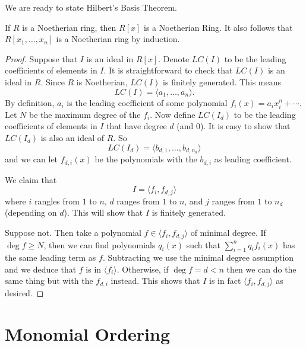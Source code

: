 We are ready to state Hilbert's Basis Theorem.
\begin{theorem}
If $R$ is a Noetherian ring, then $R[x]$ is a Noetherian Ring. It also follows that $R[x_1, \dots, x_n]$ is a Noetherian ring by induction.
\end{theorem}
\begin{proof}
Suppose that $I$ is an ideal in $R[x]$. Denote $LC(I)$ to be the leading coefficients of elements in $I$. It is straightforward to check that $LC(I)$ is an ideal in $R$. Since $R$ is Noetherian, $LC(I)$ is finitely generated. This means
\[LC(I) = \langle a_1, \dots, a_n \rangle.\]
By definition, $a_i$ is the leading coefficient of some polynomial $f_i(x) = a_ix^n_i + \cdots$. Let $N$ be the maximum degree of the $f_i$. Now define $LC(I_d)$ to be the leading coefficients of elements in $I$ that have degree $d$ (and $0$). It is easy to show that $LC(I_d)$ is also an ideal of $R$. So
\[LC(I_d) = \langle b_{d,1}, \dots, b_{d, n_d} \rangle\] and we can let $f_{d, i}(x)$ be the polynomials with the $b_{d, i}$ as leading coefficient.

We claim that 
\[I = \langle f_i, f_{d, j} \rangle\] where $i$ rangles from $1$ to $n$, $d$ ranges from $1$ to $n$, and $j$ ranges from $1$ to $n_d$ (depending on $d$). This will show that $I$ is finitely generated.

Suppose not. Then take a polynomial $f \in \langle f_i, f_{d, j} \rangle$ of minimal degree. If $\deg{f} \geq N$, then we can find polynomials $q_i(x)$ such that $\sum_{i = 1}^nq_if_i(x)$ has the same leading term as $f$. Subtracting we use the minimal degree assumption and we deduce that $f$ is in $\langle f_i \rangle$.
Otherwise, if $\deg{f} = d < n$ then we can do the same thing but with the $f_{d, i}$ instead. This shows that $I$ is in fact $\langle f_i, f_{d, j}\rangle$ as desired.
\end{proof}

\section{Monomial Ordering}
